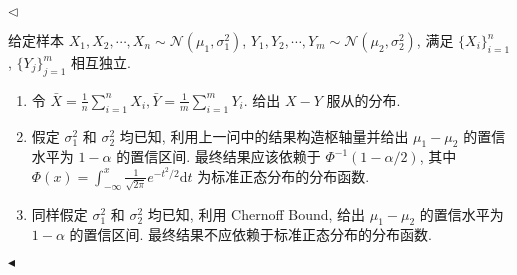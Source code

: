 \documentclass[11pt]{article}
\newenvironment{problem}[2][Problem]{\begin{trivlist}
    \item[\hskip \labelsep {\bfseries #1}\hskip \labelsep {\bfseries #2.}]\songti}{\hfill$\blacktriangleleft$\end{trivlist}}
\newenvironment{answer}[1][Solution]{\begin{trivlist}
    \item[\hskip \labelsep {\bfseries #1.}\hskip \labelsep]}{\hfill$\lhd$\end{trivlist}}
\newcommand\1{\mathds{1}}
\newcommand\R{\mathbb{R}}
\newcommand\N{\mathbb{N}}
\newcommand\PP{\mathbb{P}}
\newcommand\dd{\mathrm{d}}
\newcommand{\arrp}{\xrightarrow{P}}
\begin{document}
\begin{answer}
\end{answer}

\begin{problem}{4}
    给定样本 $X_1, X_2, \cdots, X_n \sim \mathcal{N}(\mu_1, \sigma_1^2)$, $Y_1, Y_2, \cdots, Y_m \sim \mathcal{N}(\mu_2, \sigma_2^2)$, 满足 $\{X_i\}_{i=1}^n$, $\{Y_j\}_{j=1}^m$ 相互独立.
    \begin{enumerate}[label = (\arabic*)]
        \item 令 $\bar{X} = \frac{1}{n} \sum_{i=1}^{n}X_i, \bar{Y} = \frac{1}{m} \sum_{i=1}^{m}Y_i$. 给出 $X - Y$ 服从的分布.
        \item 假定 $\sigma_1^2$ 和 $\sigma_2^2$ 均已知, 利用上一问中的结果构造枢轴量并给出 $\mu_1 - \mu_2$ 的置信水平为 $1-\alpha$ 的置信区间.
        最终结果应该依赖于 $\Phi^{-1}(1-\alpha/2)$, 其中 $\Phi(x) = \int_{-\infty}^{x} \frac{1}{\sqrt{2\pi}}e^{-t^2/2}\dd t$ 为标准正态分布的分布函数.
        \item 同样假定 $\sigma_1^2$ 和 $\sigma_2^2$ 均已知, 利用 Chernoff Bound, 给出 $\mu_1 - \mu_2$ 的置信水平为 $1-\alpha$ 的置信区间. 最终结果不应依赖于标准正态分布的分布函数.
    \end{enumerate}
\end{problem}
\end{document}

